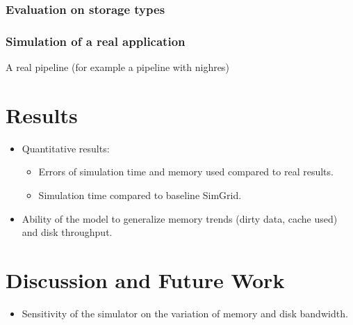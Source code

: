 \documentclass[conference]{IEEEtran}
\begin{document}
			\subsubsection{Evaluation on storage types}

				

			\subsubsection{Simulation of a real application}
				A real pipeline (for example a pipeline with nighres)

	\section{Results}
	
		\begin{itemize}

			\item Quantitative results: 
				\begin{itemize}
					\item Errors of simulation time and memory used compared to real results.
					\item Simulation time compared to baseline SimGrid.
				\end{itemize} 

			\item Ability of the model to generalize memory trends (dirty data, cache used) and disk throughput.

		\end{itemize}

	\section{Discussion and Future Work}
		\begin{itemize}
			\item Sensitivity of the simulator on the variation of memory and disk bandwidth. 
		\end{itemize}


\end{document}
